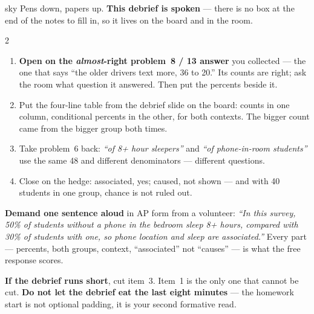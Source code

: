 \documentclass[10pt]{article}
\begin{document}
\boxguard
\begin{skillbox}{sky}
Pens down, papers up. \textbf{This debrief is spoken} --- there is no box at the end of the
notes to fill in, so it lives on the board and in the room.
\begin{multicols}{2}
\begin{enumerate}[leftmargin=1.3em, nosep, itemsep=3pt]
  \item \textbf{Open on the \emph{almost}-right problem~8 / 13 answer} you collected --- the
        one that says ``the older drivers text more, 36 to 20.'' Its counts are right; ask the
        room what question it answered. Then put the percents beside it.
  \item Put the four-line table from the debrief slide on the board: counts in one column,
        conditional percents in the other, for both contexts. The bigger count came from the
        bigger group both times.
  \item Take problem~6 back: \emph{``of 8+ hour sleepers''} and \emph{``of phone-in-room
        students''} use the same 48 and different denominators --- different questions.
  \item Close on the hedge: associated, yes; caused, not shown --- and with 40 students in one
        group, chance is not ruled out.
\end{enumerate}
\columnbreak
\textbf{Demand one sentence aloud} in AP form from a volunteer: \emph{``In this survey, 50\% of
students without a phone in the bedroom sleep 8+ hours, compared with 30\% of students with one,
so phone location and sleep are associated.''} Every part --- percents, both groups, context,
``associated'' not ``causes'' --- is what the free response scores.

\textbf{If the debrief runs short}, cut item~3. Item~1 is the only one that cannot be cut.
\textbf{Do not let the debrief eat the last eight minutes} --- the homework start is not optional
padding, it is your second formative read.
\end{multicols}
\end{skillbox}
\end{document}

